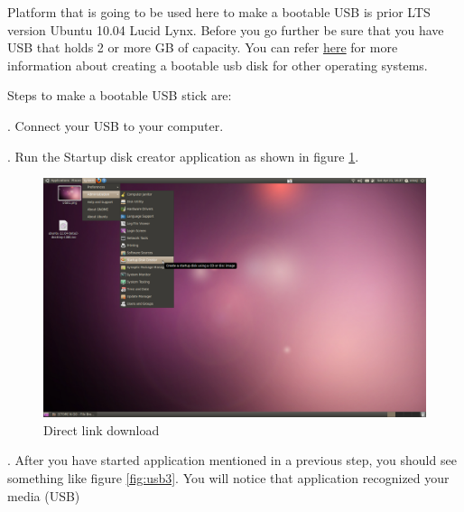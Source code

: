 \par \noindent Platform that is going to be used here to make a bootable USB is prior LTS version Ubuntu 10.04 Lucid Lynx. Before you go further be sure that you have USB that holds 2 or more GB of capacity. You can refer \href{http://www.ubuntu.com/download/ubuntu/download}{here} for more information about creating a bootable usb disk for other operating systems.\\

\newpage
\par \noindent Steps to make a bootable USB stick are: \\

\par {}. Connect your USB to your computer.\\

\par {}. Run the Startup disk creator application as shown in figure \ref{fig:usb2}. \\

\begin{figure}[h!]	
	\begin{center}
	\includegraphics[width=400pt]{./images/obtain-ubuntu/USB2.png}
	\caption{Direct link download}	
	\label{fig:usb2}	
	\end{center}
\end{figure}

\par {}. After you have started application mentioned in a previous step, you should see something like figure \ref{fig:usb3}. You will notice that application recognized your media (USB) \\

